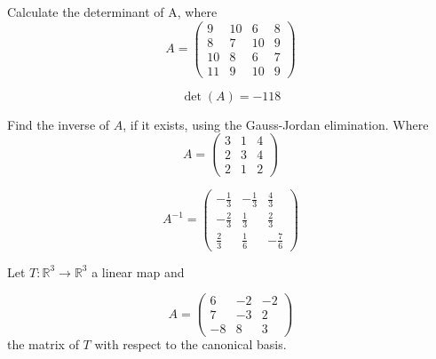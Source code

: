 \begin{questions}

\question Calculate the determinant of A, where
$$
A=\left(\begin{array}{rrrr}
9 & 10 & 6 & 8 \\
8 & 7 & 10 & 9 \\
10 & 8 & 6 & 7 \\
11 & 9 & 10 & 9
\end{array}\right)
$$

\begin{solution}
$$\det(A)=-118$$
\end{solution}

\question Find the inverse of $A$, if it exists, using the Gauss-Jordan elimination. Where
$$
A=\left(\begin{array}{rrr}
3 & 1 & 4 \\
2 & 3 & 4 \\
2 & 1 & 2
\end{array}\right)
$$

\begin{solution}
$$A^{-1}=\left(\begin{array}{rrr}
-\frac{1}{3} & -\frac{1}{3} & \frac{4}{3} \\
-\frac{2}{3} & \frac{1}{3} & \frac{2}{3} \\
\frac{2}{3} & \frac{1}{6} & -\frac{7}{6}
\end{array}\right)$$
\end{solution}

\question Let $T:\mathbb{R}^3\rightarrow\mathbb{R}^3$  a linear map and
 
$$
A=\left(\begin{array}{rrr}
6 & -2 & -2 \\
7 & -3 & 2 \\
-8 & 8 & 3
\end{array}\right)
$$
the matrix of $T$ with respect to the canonical basis.
\end{questions}
